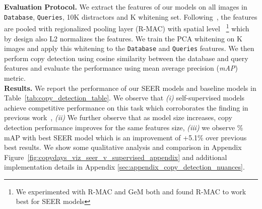\documentclass[10pt,twocolumn,letterpaper]{article}
\begin{document}
\noindent\textbf{Evaluation Protocol.} We extract the features of our models on all images in \texttt{Database}, \texttt{Queries}, 10K distractors and K whitening set. Following~\cite{tolias2016particular}, the features are pooled with regionalized pooling layer (R-MAC) with spatial level ~\footnote{We experimented with R-MAC and GeM both and found R-MAC to work best for SEER models} which by design also L2 normalizes the features. We train the PCA whitening on K images and apply this whitening to the \texttt{Database} and \texttt{Queries} features. We then perform copy detection using cosine similarity between the database and query features and evaluate the performance using mean average precision (\textit{mAP}) metric. \\

\noindent\textbf{Results.}
We report the performance of our SEER models and baseline models in Table~\ref{tab:copy_detection_table}. We observe that \textit{(i)} self-supervised models achieve competitive performance on this task which corroborates the finding in previous work~\cite{caron2021emerging}, \textit{(ii)} We further observe that as model size increases, copy detection performance improves for the same features size, \textit{(iii)} we observe \% mAP with best SEER model which is an improvement of +5.1\% over previous best results. We show some qualitative analysis and comparison in Appendix Figure~\ref{fig:copydays_viz_seer_v_supervised_appendix} and additional implementation details in Appendix \ref{sec:appendix_copy_detection_nuances}.
\end{document}
